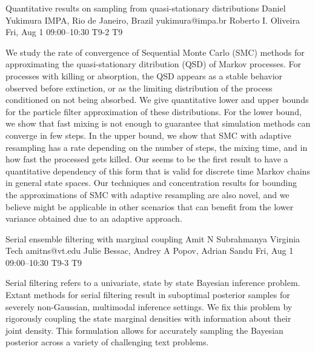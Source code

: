 \begin{talk}
  {Quantitative results on sampling from quasi-stationary distributions}%
  {Daniel Yukimura}%
  {IMPA, Rio de Janeiro, Brazil}%
  {yukimura@impa.br}%
  {Roberto I. Oliveira}%
  {}%
  {Fri, Aug 1 09:00–10:30}%
  {T9-2}%
  {T9}%
  
				
			
    We study the rate of convergence of Sequential Monte Carlo (SMC) methods for approximating the quasi-stationary ditribution (QSD) of Markov processes. 
    For processes with killing or absorption, the QSD appears as a stable behavior observed before extinction, or as the limiting distribution of the process conditioned on not being absorbed. 
    We give quantitative lower and upper bounds for the particle filter approximation of these distributions.
    For the lower bound, we show that fast mixing is not enough to guarantee that simulation methods can converge in few steps.
    In the upper bound, we show that SMC with adaptive resampling has a rate depending on the number of steps, the mixing time, and in how fast the processed gets killed.
    Our seems to be the first result to have a quantitative dependency of this form that is valid for discrete time Markov chains in general state spaces.
    Our techniques and concentration results for bounding the approximations of SMC with adaptive resampling are also novel, and we believe might be applicable in other scenarios that can benefit from the lower variance obtained due to an adaptive approach.
    
    

\medskip


\end{talk}

\begin{talk}
  {Serial ensemble filtering with marginal coupling}%
  {Amit N Subrahmanya}%
  {Virginia Tech}%
  {amitns@vt.edu}%
  {Julie Bessac, Andrey A Popov, Adrian Sandu}%
  {}%
  {Fri, Aug 1 09:00–10:30}%
  {T9-3}%
  {T9}%
  
				
			
 Serial filtering refers to a univariate, state by state Bayesian inference problem. 
 Extant methods for serial filtering result in suboptimal posterior samples for severely non-Gaussian, multimodal inference settings. 
 We fix this problem by rigorously coupling the state marginal densities with information about their joint density.
 This formulation allows for accurately sampling the Bayesian posterior across a variety of challenging text problems.
 
\medskip

\end{talk}


